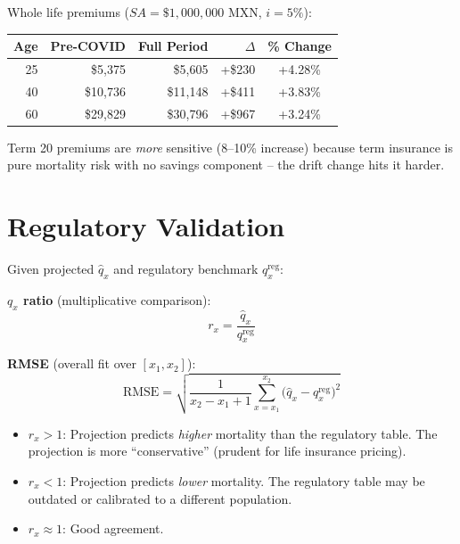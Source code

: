 \documentclass[11pt,a4paper]{article}
\theoremstyle{definition}
\begin{document}
\begin{application}
Whole life premiums ($SA = \$1{,}000{,}000$ MXN, $i = 5\%$):
\begin{center}
\begin{tabular}{rrrrc}
\toprule
Age & Pre-COVID & Full Period & $\Delta$ & \% Change \\
\midrule
25 & \$5{,}375 & \$5{,}605 & +\$230 & +4.28\% \\
40 & \$10{,}736 & \$11{,}148 & +\$411 & +3.83\% \\
60 & \$29{,}829 & \$30{,}796 & +\$967 & +3.24\% \\
\bottomrule
\end{tabular}
\end{center}

Term 20 premiums are \emph{more} sensitive (8--10\% increase) because
term insurance is pure mortality risk with no savings component -- the
drift change hits it harder.
\end{application}

\section{Regulatory Validation}
\label{sec:validation}

\begin{formaldef}
Given projected $\hat{q}_x$ and regulatory benchmark $q_x^{\text{reg}}$:

\textbf{$q_x$ ratio} (multiplicative comparison):
\begin{equation}
  r_x = \frac{\hat{q}_x}{q_x^{\text{reg}}}
  \label{eq:qx-ratio}
\end{equation}

\textbf{RMSE} (overall fit over $[x_1, x_2]$):
\begin{equation}
  \text{RMSE} = \sqrt{\frac{1}{x_2 - x_1 + 1}\sum_{x=x_1}^{x_2}
  \bigl(\hat{q}_x - q_x^{\text{reg}}\bigr)^2}
  \label{eq:rmse}
\end{equation}
\end{formaldef}

\begin{intuition}
\begin{itemize}
  \item $r_x > 1$: Projection predicts \emph{higher} mortality than the
    regulatory table. The projection is more ``conservative'' (prudent for
    life insurance pricing).
  \item $r_x < 1$: Projection predicts \emph{lower} mortality. The
    regulatory table may be outdated or calibrated to a different population.
  \item $r_x \approx 1$: Good agreement.
\end{itemize}
\end{intuition}
\end{document}
